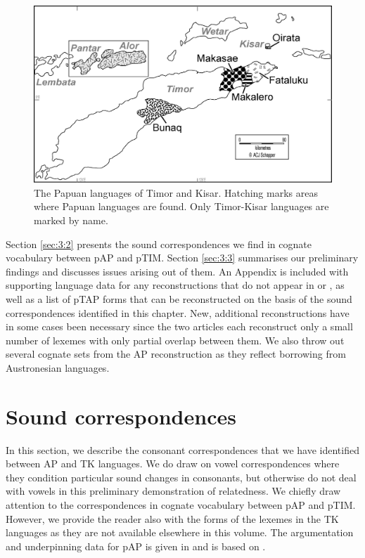 \begin{figure}
\includegraphics[width=\textwidth]{figures/ch3_map.png}
\caption[The Papuan languages of Timor and Kisar]{The Papuan languages of Timor and Kisar. Hatching marks areas where Papuan languages are found. Only Timor-Kisar languages are marked by name.}
\end{figure}

Section \ref{sec:3:2} presents the sound correspondences we find in cognate vocabulary between pAP and pTIM. Section \ref{sec:3:3} summarises our preliminary findings and discusses issues arising out of them. An Appendix is included with supporting language data for any reconstructions that do not appear in \citet{HoltonEtAl2012} or \citet{SchapperEtAl2012}, as well as a list of pTAP forms that can be reconstructed on the basis of the sound correspondences identified in this chapter. New, additional reconstructions have in some cases been necessary since the two articles each reconstruct only a small number of lexemes with only partial overlap between them. We also throw out several cognate sets from the AP reconstruction as they reflect borrowing from Austronesian languages. 

\section{Sound correspondences}
In this section, we describe the consonant correspondences that we have identified between AP and TK languages. We do draw on vowel correspondences where they condition particular sound changes in consonants, but otherwise do not deal with vowels in this preliminary demonstration of relatedness. We chiefly draw attention to the correspondences in cognate vocabulary between pAP and pTIM. However, we provide the reader also with the forms of the lexemes in the TK languages as they are not available elsewhere in this volume. The argumentation and underpinning data for pAP is given in \citet{HoltonRobinsonTV} and is based on \citet{HoltonEtAl2012}.

